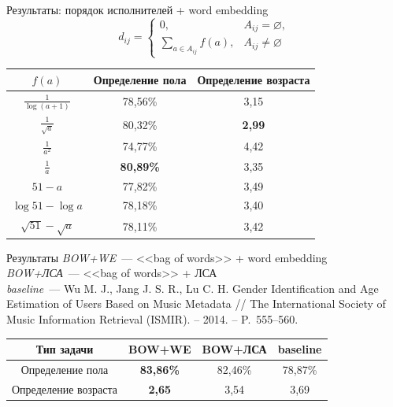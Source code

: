 \documentclass{beamer}
\newcommand{\prevGender}{78,87\%}
\newcommand{\prevAge}{3,69}
\begin{document}
\begin{frame}{Результаты: порядок исполнителей + word embedding}
    \[d_{ij} = \begin{cases}
              0,& A_{ij} = \varnothing,\\
              \sum\limits_{a \in A_{ij}}{f(a)},& A_{ij} \ne \varnothing
          \end{cases}\]
\begin{table}[!h]
\centering
\begin{tabular}{|c|c|c|}\hline
    \boldmath$f(a)$ & \textbf{Определение пола} & \textbf{Определение возраста} \\\hline
    $\frac{1}{\log(a + 1)}$ & 78,56\% & 3,15 \\\hline
    $\frac{1}{\sqrt{a}}$ & 80,32\% & \textbf{2,99} \\\hline
    $\frac{1}{a^2}$ & 74,77\% & 4,42 \\\hline
    $\frac{1}{a}$ & \textbf{80,89\%} & 3,35 \\\hline
    $51 - a$ & 77,82\% & 3,49 \\\hline
    $\log{51} - \log{a}$ & 78,18\% & 3,40 \\\hline
    $\sqrt{51} - \sqrt{a}$ & 78,11\% & 3,42 \\\hline
\end{tabular}
\end{table}
\end{frame}

\begin{frame}{Результаты}
    \textit{BOW+WE}~--- <<bag of words>> + word embedding \\
    \textit{BOW+ЛСА}~--- <<bag of words>> + ЛСА \\
    \textit{baseline}~--- Wu M. J.,
        Jang J. S. R., Lu C. H. Gender Identification
        and Age Estimation of Users Based on Music 
        Metadata // The International Society of Music Information Retrieval (ISMIR). – 2014. – P.~555--560.
    \begin{table}[h!]
    \centering
    \begin{tabular}{|c|c|c|c|}
    \hline
    \textbf{Тип задачи} & \textbf{BOW+WE} & \textbf{BOW+ЛСА} & \textbf{baseline} \tabularnewline
    \hline
    Определение пола & \textbf{83,86\%} & 82,46\% & \prevGender \tabularnewline
    \hline
    Определение возраста & \textbf{2,65} & 3,54 & \prevAge \tabularnewline
    \hline
    \end{tabular}
    \label{tab:total_results}
    \end{table}
\end{frame}
\end{document}
